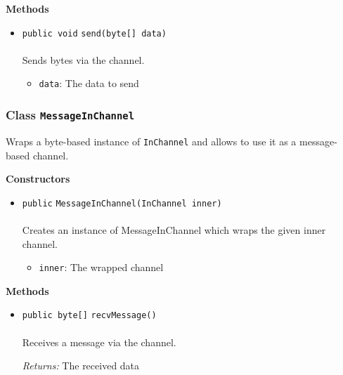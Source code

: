 \textbf{\sffamily Methods}
\begin{itemize}
\item \lstinline|public void| \lstinline|send|\lstinline|(byte[] data)|\\ \\[-0.6em]
Sends bytes via the channel.
\begin{itemize}
\item \lstinline|data|: The data to send
\end{itemize}



\end{itemize}

\subsubsection{Class \lstinline|MessageInChannel|}
Wraps a byte-based instance of \lstinline|InChannel| and allows to use it as a message-based
 channel. \\
\noindent\begin{minipage}[t]{5cm}
\vspace{0.3em}
\hspace*{2em}
\vspace{0.3em}
\end{minipage}




\textbf{\sffamily Constructors}
\begin{itemize}
\item \lstinline|public| \lstinline|MessageInChannel|\lstinline|(InChannel inner)|\\ \\[-0.6em]
Creates an instance of MessageInChannel which wraps the given inner channel.
\begin{itemize}
\item \lstinline|inner|: The wrapped channel
\end{itemize}



\end{itemize}


\textbf{\sffamily Methods}
\begin{itemize}
\item \lstinline|public byte[]| \lstinline|recvMessage|\lstinline|()|\\ \\[-0.6em]
Receives a message via the channel.

\emph{Returns:} The received data

\end{itemize}

